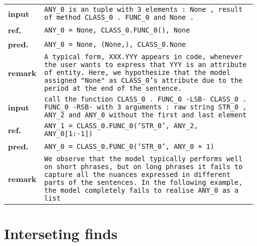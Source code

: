 \documentclass{article}
\begin{document}
  \begin{tabular}{ l p{}}
    \hline
		\textbf{input} & \texttt{ANY\_0 is an tuple with 3 elements : None , result of method 
                     CLASS\_0 . FUNC\_0 and None .} \\
    \textbf{ref.}  & \texttt{ANY\_0 = None, CLASS\_0.FUNC\_0(), None} \\
    \textbf{pred.} & \texttt{ANY\_0 = None, (None,), CLASS\_0.None} \\
    \textbf{remark}& \texttt{A typical form, XXX.YYY appears in code, whenever the user wants to 
                     express that YYY is an attribute of entity. Here, we hypothesize that the 
                     model assigned "None" as CLASS\_0's attribute due to the period at the end 
                     of the sentence.} \\
    \hline
		\textbf{input} & \texttt{call the function CLASS\_0 . FUNC\_0 -LSB- CLASS\_0 . FUNC\_0 -RSB- 
                     with 3 arguments : raw string STR\_0 , ANY\_2 and ANY\_0 without the first 
                     and last element} \\
    \textbf{ref.}  & \texttt{ANY\_1 = CLASS\_0.FUNC\_0('STR\_0', ANY\_2, ANY\_0[1:-1])} \\
    \textbf{pred.} & \texttt{ANY\_0 = CLASS\_0.FUNC\_0('STR\_0', ANY\_0 + 1)} \\ 
    \textbf{remark}& \texttt{We observe that the model typically performs well on short phrases, 
                     but on long phrases it fails to capture all the nuances expressed in 
                     different parts of the sentences. In the following example, the model 
                     completely fails to realise ANY\_0 as a list} \\
    \hline
  \end{tabular}

  \section{Interseting finds}
\end{document}
